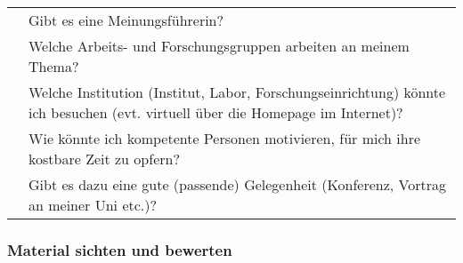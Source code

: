 \documentclass[]{article}
\begin{document}
\begin{longtable}[]{@{}cl@{}}
\begin{minipage}[t]{0.27\columnwidth}\centering\strut
\strut
\end{minipage} & \begin{minipage}[t]{0.67\columnwidth}\raggedright\strut
Gibt es eine Meinungsführerin?\strut
\end{minipage}\tabularnewline
\begin{minipage}[t]{0.27\columnwidth}\centering\strut
\strut
\end{minipage} & \begin{minipage}[t]{0.67\columnwidth}\raggedright\strut
Welche Arbeits- und Forschungsgruppen arbeiten an meinem Thema?\strut
\end{minipage}\tabularnewline
\begin{minipage}[t]{0.27\columnwidth}\centering\strut
\strut
\end{minipage} & \begin{minipage}[t]{0.67\columnwidth}\raggedright\strut
Welche Institution (Institut, Labor, Forschungseinrichtung) könnte ich
besuchen (evt. virtuell über die Homepage im Internet)?\strut
\end{minipage}\tabularnewline
\begin{minipage}[t]{0.27\columnwidth}\centering\strut
\strut
\end{minipage} & \begin{minipage}[t]{0.67\columnwidth}\raggedright\strut
Wie könnte ich kompetente Personen motivieren, für mich ihre kostbare
Zeit zu opfern?\strut
\end{minipage}\tabularnewline
\begin{minipage}[t]{0.27\columnwidth}\centering\strut
\strut
\end{minipage} & \begin{minipage}[t]{0.67\columnwidth}\raggedright\strut
Gibt es dazu eine gute (passende) Gelegenheit (Konferenz, Vortrag an
meiner Uni etc.)?\strut
\end{minipage}\tabularnewline
\bottomrule
\end{longtable}

\subsubsection{Material sichten und
bewerten}\label{material-sichten-und-bewerten}
\end{document}
